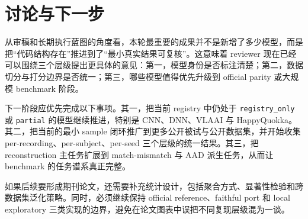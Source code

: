 \section{讨论与下一步}

从审稿和长期执行蓝图的角度看，本轮最重要的成果并不是新增了多少模型，而是把“代码结构存在”推进到了“最小真实结果可复核”。这意味着 reviewer 现在已经可以围绕三个层级提出更具体的意见：第一，模型身份是否标注清楚；第二，数据切分与打分边界是否统一；第三，哪些模型值得优先升级到 official parity 或大规模 benchmark 阶段。

下一阶段应优先完成以下事项。其一，把当前 registry 中仍处于 \texttt{registry\_only} 或 \texttt{partial} 的模型继续推进，特别是 CNN、DNN、VLAAI 与 HappyQuokka。其二，把当前的最小 sample 闭环推广到更多公开被试与公开数据集，并开始收集 per-recording、per-subject、per-seed 三个层级的统一结果。其三，把 reconstruction 主任务扩展到 match-mismatch 与 AAD 派生任务，从而让 benchmark 的任务谱系真正完整。

如果后续要形成期刊论文，还需要补充统计设计，包括聚合方式、显著性检验和跨数据集泛化策略。同时，必须继续保持 official reference、faithful port 和 local exploratory 三类实现的边界，避免在论文图表中误把不同复现层级混为一谈。
